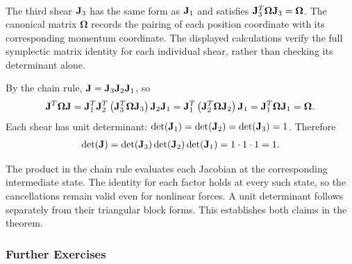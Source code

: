 \documentclass[../main.tex]{subfiles}
\begin{document}
{\begin{align*}
\end{align*}
The third shear $\mathbf{J}_3$ has the same form as $\mathbf{J}_1$ and satisfies $\mathbf{J}_3^T \boldsymbol{\Omega} \mathbf{J}_3 = \boldsymbol{\Omega}$.
The canonical matrix $\boldsymbol\Omega$ records the pairing of each position coordinate with its corresponding momentum coordinate. The displayed calculations verify the full symplectic matrix identity for each individual shear, rather than checking its determinant alone.

By the chain rule, $\mathbf{J} = \mathbf{J}_3 \mathbf{J}_2 \mathbf{J}_1$, so
\begin{align*}
    \mathbf{J}^T \boldsymbol{\Omega} \mathbf{J} = \mathbf{J}_1^T \mathbf{J}_2^T \left( \mathbf{J}_3^T \boldsymbol{\Omega} \mathbf{J}_3 \right) \mathbf{J}_2 \mathbf{J}_1 = \mathbf{J}_1^T \left( \mathbf{J}_2^T \boldsymbol{\Omega} \mathbf{J}_2 \right) \mathbf{J}_1 = \mathbf{J}_1^T \boldsymbol{\Omega} \mathbf{J}_1 = \boldsymbol{\Omega}.
\end{align*}
Each shear has unit determinant: $\det(\mathbf{J}_1) = \det(\mathbf{J}_2) = \det(\mathbf{J}_3) = 1$.
Therefore
\begin{align*}
    \det(\mathbf{J}) = \det(\mathbf{J}_3)\det(\mathbf{J}_2)\det(\mathbf{J}_1) = 1 \cdot 1 \cdot 1 = 1.
\end{align*}


The product in the chain rule evaluates each Jacobian at the corresponding intermediate state. The identity for each factor holds at every such state, so the cancellations remain valid even for nonlinear forces. A unit determinant follows separately from their triangular block forms. This establishes both claims in the theorem.
}



\subsubsection{Further Exercises}
\end{document}
